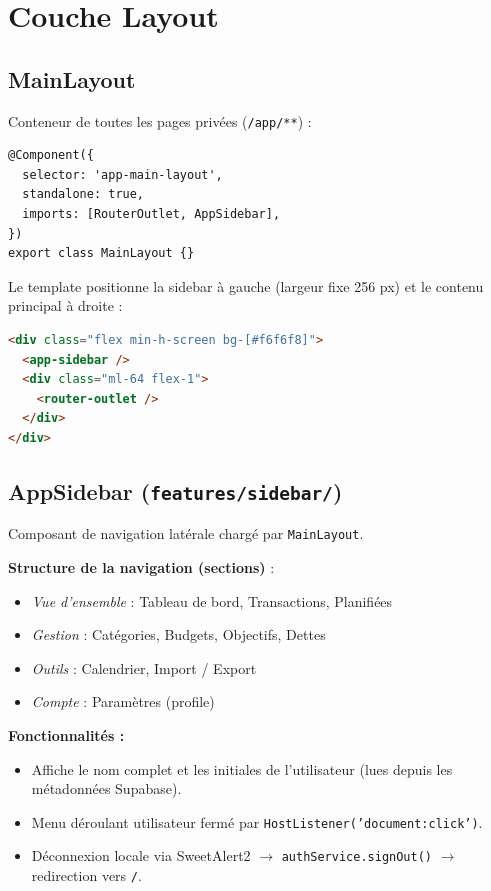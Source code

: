 \documentclass[12pt,a4paper]{article}
\begin{document}
\section{Couche Layout}

\subsection{MainLayout}

Conteneur de toutes les pages privées (\texttt{/app/**}) :

\begin{lstlisting}
@Component({
  selector: 'app-main-layout',
  standalone: true,
  imports: [RouterOutlet, AppSidebar],
})
export class MainLayout {}
\end{lstlisting}

Le template positionne la sidebar à gauche (largeur fixe 256 px) et le
contenu principal à droite :

\begin{lstlisting}[language=html, numbers=none]
<div class="flex min-h-screen bg-[#f6f6f8]">
  <app-sidebar />
  <div class="ml-64 flex-1">
    <router-outlet />
  </div>
</div>
\end{lstlisting}

\subsection{AppSidebar (\texttt{features/sidebar/})}

Composant de navigation latérale chargé par \texttt{MainLayout}.

\textbf{Structure de la navigation (sections)} :
\begin{itemize}
  \item \textit{Vue d'ensemble} : Tableau de bord, Transactions, Planifiées
  \item \textit{Gestion} : Catégories, Budgets, Objectifs, Dettes
  \item \textit{Outils} : Calendrier, Import / Export
  \item \textit{Compte} : Paramètres (profile)
\end{itemize}

\textbf{Fonctionnalités :}
\begin{itemize}
  \item Affiche le nom complet et les initiales de l'utilisateur (lues depuis les
        métadonnées Supabase).
  \item Menu déroulant utilisateur fermé par \texttt{HostListener('document:click')}.
  \item Déconnexion locale via SweetAlert2 $\to$ \texttt{authService.signOut()} $\to$
        redirection vers \texttt{/}.
\end{itemize}
\end{document}
